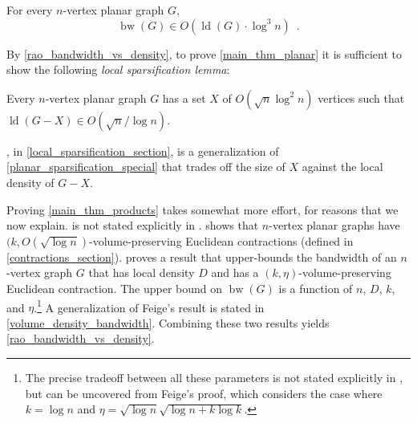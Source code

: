 \documentclass{patmorin}
\newcommand{\defin}[1]{\emph{\textcolor{brightmaroon}{#1}}}
\DeclareMathOperator{\bw}{bw}
\DeclareMathOperator{\ld}{ld}
\begin{document}
\begin{thm}
\label{rao_bandwidth_vs_density}
  For every $n$-vertex planar graph $G$,
  \[
    \bw(G)\in O\left(\ld(G)\cdot \log^3 n\right) \enspace .
  \]
\end{thm}

By \cref{rao_bandwidth_vs_density}, to prove \cref{main_thm_planar} it is sufficient to show the following \defin{local sparsification lemma}:

\begin{lem}\label{planar_sparsification_special}
  Every $n$-vertex planar graph $G$ has a set $X$ of $O(\sqrt{n}\log^2 n)$ vertices such that $\ld(G-X)\in O(\sqrt{n}/\log n)$.
\end{lem}


, in \cref{local_sparsification_section}, is a generalization of \cref{planar_sparsification_special} that trades off the size of $X$ against the local density of $G-X$.

Proving \cref{main_thm_products} takes somewhat more effort, for reasons that we now explain.
 is not stated explicitly in \cite{rao:small}. \citet{rao:small} shows that $n$-vertex planar graphs have $(k,O(\sqrt{\log n})$-volume-preserving Euclidean contractions (defined in \cref{contractions_section}). \citet{feige:approximating} proves a result that upper-bounds the bandwidth of an $n$-vertex graph $G$ that has local density $D$ and has a $(k,\eta)$-volume-preserving Euclidean contraction.  The upper bound on $\bw(G)$ is a function of $n$, $D$, $k$, and $\eta$.\footnote{The precise tradeoff between all these parameters is not stated explicitly in \cite{feige:approximating}, but can be uncovered from Feige's proof, which considers the case where $k=\log n$ and $\eta=\sqrt{\log n}\sqrt{\log n+ k\log k}$.}  A generalization of Feige's result is stated in \cref{volume_density_bandwidth}.  Combining these two results yields \cref{rao_bandwidth_vs_density}.
\end{document}
